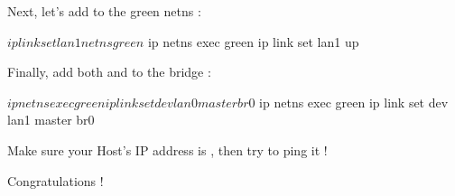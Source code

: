 Next, let's add  to the green netns :

\begin{targetbashinput}
$ ip link set lan1 netns green
$ ip netns exec green ip link set lan1 up
\end{targetbashinput}

Finally, add both  and  to the bridge :

\begin{targetbashinput}
$ ip netns exec green ip link set dev lan0 master br0
$ ip netns exec green ip link set dev lan1 master br0
\end{targetbashinput}

Make sure your Host's IP address is , then try to ping it !

Congratulations !
